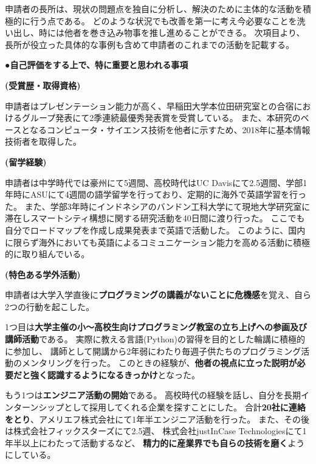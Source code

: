 {申請者の長所は、現状の問題点を独自に分析し、解決のために主体的な活動を積極的に行う点である。
どのような状況でも改善を第一に考え今必要なことを洗い出し、時には他者を巻き込み物事を推し進めることができる。
次項目より、長所が役立った具体的な事例も含めて申請者のこれまでの活動を記載する。

\noindent
●\textbf{自己評価をする上で、特に重要と思われる事項}

\textbf{(受賞歴・取得資格)}

申請者はプレゼンテーション能力が高く、早稲田大学本位田研究室との合宿におけるグループ発表にて2季連続最優秀発表賞を受賞している。
また、本研究のベースとなるコンピュータ・サイエンス技術を他者に示すため、2018年に基本情報技術者を取得した。

\textbf{(留学経験)}

申請者は中学時代では豪州にて5週間、高校時代はUC Davisにて2.5週間、学部1年時にASUにて4週間の語学留学を行っており、定期的に海外で英語学習を行った。
また、学部3年時にインドネシアのバンドン工科大学にて現地大学研究室に滞在しスマートシティ構想に関する研究活動を40日間に渡り行った。
ここでも自分でロードマップを作成し成果発表まで英語で活動した。
このように、国内に限らず海外においても英語によるコミュニケーション能力を高める活動に積極的に取り組んでいる。

\textbf{(特色ある学外活動)}

申請者は大学入学直後に\textbf{プログラミングの講義がないことに危機感}を覚え、自ら2つの行動を起こした。

1つ目は\textbf{大学主催の小〜高校生向けプログラミング教室の立ち上げへの参画及び講師活動}である。
実際に教える言語(Python)の習得を目的とした輪講に積極的に参加し、
講師として開講から2年弱にわたり毎週子供たちのプログラミング活動のメンタリングを行った。
このときの経験が、\textbf{他者の視点に立った説明が必要だと強く認識するようになるきっかけ}となった。

もう1つは\textbf{エンジニア活動の開始}である。
高校時代の経験を話し、自分を長期インターンシップとして採用してくれる企業を探すことにした。
合計\textbf{20社に連絡をとり}、アメリエフ株式会社にて1年半エンジニア活動を行った。
また、その後は株式会社フィックスターズにて2.5週、
株式会社justInCase Technologiesにて1年半以上にわたって活動するなど、
\textbf{精力的に産業界でも自らの技術を磨く}ようにしている。

}


